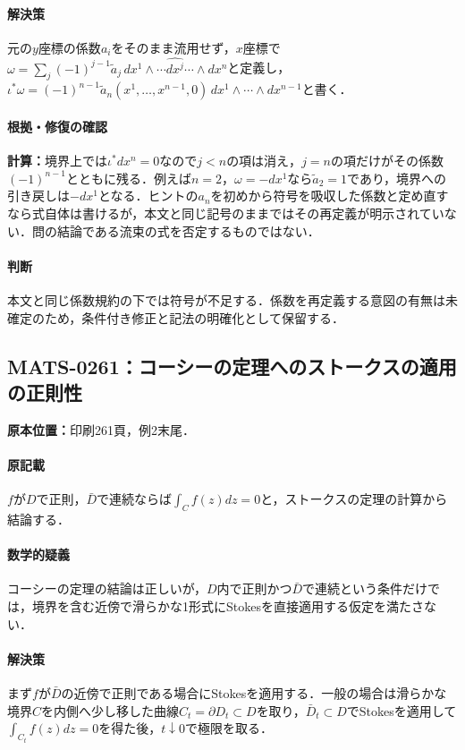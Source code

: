\documentclass[a4paper,10pt]{ltjsarticle}
\begin{document}
\paragraph{解決策}元の$y$座標の係数$a_i$をそのまま流用せず，$x$座標で$\omega=\sum_j(-1)^{j-1}\widetilde a_j\,dx^1\wedge\cdots\widehat{dx^j}\cdots\wedge dx^n$と定義し，$\iota^*\omega=(-1)^{n-1}\widetilde a_n(x^1,\ldots,x^{n-1},0)\,dx^1\wedge\cdots\wedge dx^{n-1}$と書く．

\paragraph{根拠・修復の確認}\textbf{計算：}境界上では$\iota^*dx^n=0$なので$j<n$の項は消え，$j=n$の項だけがその係数$(-1)^{n-1}$とともに残る．例えば$n=2$，$\omega=-dx^1$なら$\widetilde a_2=1$であり，境界への引き戻しは$-dx^1$となる．ヒントの$a_n$を初めから符号を吸収した係数と定め直すなら式自体は書けるが，本文と同じ記号のままではその再定義が明示されていない．問の結論である流束の式を否定するものではない．

\paragraph{判断}本文と同じ係数規約の下では符号が不足する．係数を再定義する意図の有無は未確定のため，条件付き修正と記法の明確化として保留する．


\subsection*{MATS-0261：コーシーの定理へのストークスの適用の正則性}\label{math:MATS-0261}
\noindent\textbf{原本位置：}印刷261頁，例2末尾．

\paragraph{原記載}$f$が$D$で正則，$\bar D$で連続ならば$\int_C f(z)dz=0$と，ストークスの定理の計算から結論する．

\paragraph{数学的疑義}コーシーの定理の結論は正しいが，$D$内で正則かつ$\bar D$で連続という条件だけでは，境界を含む近傍で滑らかな1形式にStokesを直接適用する仮定を満たさない．

\paragraph{解決策}まず$f$が$\bar D$の近傍で正則である場合にStokesを適用する．一般の場合は滑らかな境界$C$を内側へ少し移した曲線$C_t=\partial D_t\subset D$を取り，$\bar D_t\subset D$でStokesを適用して$\int_{C_t}f(z)dz=0$を得た後，$t\downarrow0$で極限を取る．
\end{document}
